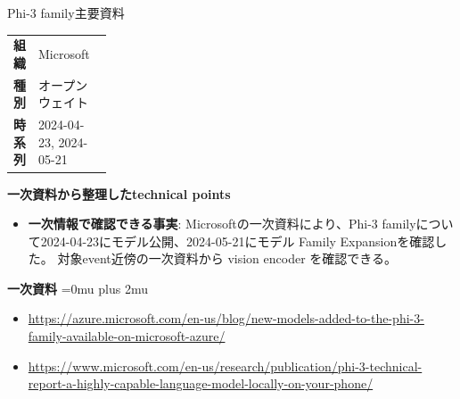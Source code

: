 \Needspace{0.38\textheight}
\begin{technicalnote}{Phi-3 family}{主要資料}
\begingroup
\begin{tabularx}{\linewidth}{@{}>{\bfseries}p{0.22\linewidth}X@{}}
組織 & Microsoft \\
種別 & オープンウェイト \\
時系列 & 2024-04-23, 2024-05-21 \\
\end{tabularx}
\smallskip
\begin{minipage}{\linewidth}
{\bfseries 一次資料から整理したtechnical points}
\begin{itemize}[leftmargin=1.5em,itemsep=0.35em]
\item \textbf{一次情報で確認できる事実}: Microsoftの一次資料により、Phi-3 familyについて2024-04-23にモデル公開、2024-05-21にモデル Family Expansionを確認した。 対象event近傍の一次資料から vision encoder を確認できる。
\end{itemize}
\begin{minipage}{\linewidth}
\begin{samepage}
{\bfseries 一次資料}
\begingroup\sloppy
\Urlmuskip=0mu plus 2mu\relax
\begin{itemize}[leftmargin=1.5em,itemsep=0.25em]
\item {\scriptsize\url{https://azure.microsoft.com/en-us/blog/new-models-added-to-the-phi-3-family-available-on-microsoft-azure/}}
\item {\scriptsize\url{https://www.microsoft.com/en-us/research/publication/phi-3-technical-report-a-highly-capable-language-model-locally-on-your-phone/}}
\end{itemize}
\endgroup
\end{samepage}
\end{minipage}
\end{minipage}
\endgroup
\end{technicalnote}
\medskip

